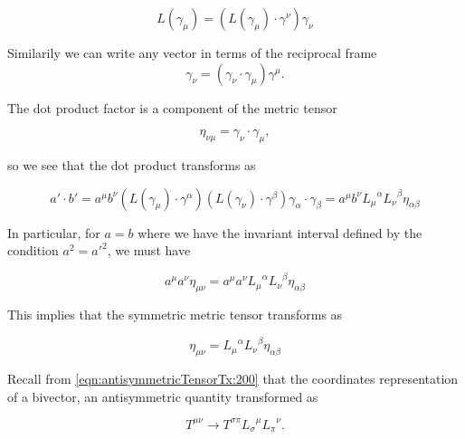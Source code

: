 \begin{equation}\label{eqn:antisymmetricTensorTx:330}
L(\gamma_\mu) = \left( L(\gamma_\mu) \cdot \gamma^\nu \right) \gamma_\nu
\end{equation}

Similarily we can write any vector in terms of the reciprocal frame
\begin{equation}\label{eqn:antisymmetricTensorTx:340}
\gamma_\nu = (\gamma_\nu \cdot \gamma_\mu) \gamma^\mu.
\end{equation}

The dot product factor is a component of the metric tensor

\begin{equation}\label{eqn:antisymmetricTensorTx:350}
\eta_{\nu \mu} = \gamma_\nu \cdot \gamma_\mu,
\end{equation}

so we see that the dot product transforms as

\begin{equation}\label{eqn:antisymmetricTensorTx:320b}
a' \cdot b' 
= a^\mu b^\nu 
( L(\gamma_\mu) \cdot \gamma^\alpha ) 
( L(\gamma_\nu) \cdot \gamma^\beta ) 
\gamma_\alpha
\cdot
\gamma_\beta
= a^\mu b^\nu 
{L_\mu}^\alpha
{L_\nu}^\beta
\eta_{\alpha \beta}
\end{equation}

In particular, for $a = b$ where we have the invariant interval defined by the condition $a^2 = {a'}^2$, we must have

\begin{equation}\label{eqn:antisymmetricTensorTx:360}
a^\mu a^\nu \eta_{\mu \nu}
= a^\mu a^\nu 
{L_\mu}^\alpha
{L_\nu}^\beta
\eta_{\alpha \beta}
\end{equation}

This implies that the symmetric metric tensor transforms as

\begin{equation}\label{eqn:antisymmetricTensorTx:370}
\eta_{\mu\nu}
=
{L_\mu}^\alpha
{L_\nu}^\beta
\eta_{\alpha \beta}
\end{equation}

Recall from \ref{eqn:antisymmetricTensorTx:200} that the coordinates representation of a bivector, an antisymmetric quantity transformed as

\begin{equation}\label{eqn:antisymmetricTensorTx:200b}
T^{\mu \nu} \rightarrow T^{\sigma \pi} {L_\sigma}^\mu {L_\pi}^\nu.
\end{equation}

